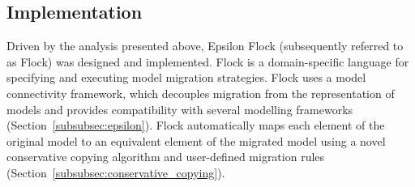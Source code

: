 % 
% 
% 


\subsection{Implementation}
\label{subsec:flock_implementation}
Driven by the analysis presented above, Epsilon Flock (subsequently referred to as Flock) was designed and implemented. Flock is a domain-specific language for specifying and executing model migration strategies. Flock uses a model connectivity framework, which decouples migration from the representation of models and provides compatibility with several modelling frameworks (Section~\ref{subsubsec:epsilon}). Flock automatically maps each element of the original model to an equivalent element of the migrated model using a novel conservative copying algorithm and user-defined migration rules (Section~\ref{subsubsec:conservative_copying}).


